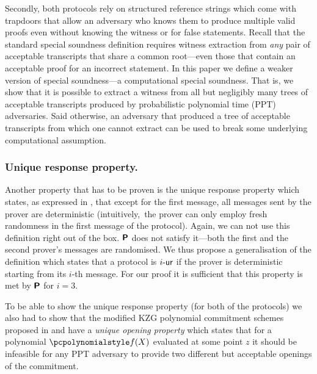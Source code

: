 \documentclass[runningheads,11pt]{llncs}
\begin{document}
Secondly, both protocols rely on structured reference strings which come with
trapdoors that allow an adversary who knows them to produce multiple valid
proofs even without knowing the witness or for false statements. Recall that the
standard special soundness definition requires witness extraction from
\emph{any} pair of acceptable transcripts that share a common root---even those
that contain an acceptable proof for an incorrect statement. In this paper we
define a weaker version of special soundness---a computational special
soundness. That is, we show that it is possible to extract a witness from all
but negligibly many trees of acceptable transcripts produced by probabilistic
polynomial time (PPT) adversaries. Said otherwise, an adversary that produced a
tree of acceptable transcripts from which one cannot extract can be used to
break some underlying computational assumption.

\subsubsection{Unique response property.} Another property that has to be proven
is the unique response property which states, as expressed in
\cite{C:Fischlin05}, that except for the first message, all messages sent by the
prover are deterministic (intuitively,~the prover can only employ fresh
randomness in the first message of the protocol). Again, we can not use this
definition right out of the box. $\bm{\mathsf{P}}$ does not satisfy it---both the
first and the second prover's messages are randomised. We thus propose a
generalisation of the definition which states that a protocol is ${i\text{-}\mathsf{ur}}$ if the
prover is deterministic starting from its $i$-th message. For our proof it is
sufficient that this property is met by $\bm{\mathsf{P}}$ for $i = 3$.

To be able to show the unique response property (for both of the protocols) we
also had to show that the modified KZG polynomial commitment schemes
\cite{AC:KatZavGol10} proposed in \cite{EPRINT:GabWilCio19} and
\cite{CCS:MBKM19} have a \emph{unique opening property} which states that for a
polynomial $\p{f}(X)$ evaluated at some point $z$ it should be infeasible for
any PPT adversary to provide two different but acceptable openings
of the commitment.
\end{document}
